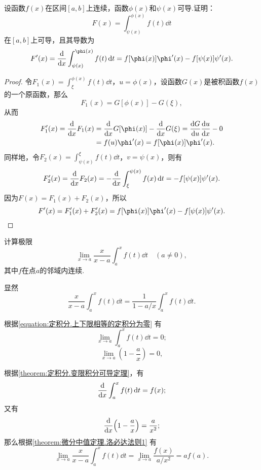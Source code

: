 \begin{example}
设函数\(f(x)\)在区间\([a,b]\)上连续，函数\(\phi(x)\)和\(\psi(x)\)可导.证明：\[
F(x) = \int_{\psi(x)}^{\phi(x)} f(t) \dd{t}
\]在\([a,b]\)上可导，且其导数为\begin{equation}\label{equation:定积分.含参变量积分的导数1}
F'(x) = \dv{x} \int_{\psi(x)}^{\phi(x)} f(t) \dd{t}
= f[\phi(x)] \phi'(x) - f[\psi(x)] \psi'(x).
\end{equation}
\begin{proof}
令\(F_1(x) = \int_{\xi}^{\phi(x)} f(t) \dd{t}\)，\(u = \phi(x)\)，设函数\(G(x)\)是被积函数\(f(x)\)的一个原函数，那么\[
F_1(x) = G[\phi(x)] - G(\xi),
\]从而\begin{align*}
F'_1(x) = \dv{x} F_1(x)
&= \dv{x} G[\phi(x)] - \dv{x} G(\xi) = \dv{G}{u} \dv{u}{x} - 0 \\
&= f(u) \phi'(x) = f[\phi(x)] \phi'(x).
\end{align*}
同样地，令\(F_2(x) = \int_{\psi(x)}^{\xi} f(t) \dd{t}\)，\(v = \psi(x)\)，则有\[
F'_2(x) = \dv{x} F_2(x) = -\dv{x} \int_{\xi}^{\psi(x)} f(x) \dd{t}
= -f[\psi(x)] \psi'(x).
\]
因为\(F(x) = F_1(x) + F_2(x)\)，所以\[
F'(x) = F'_1(x) + F'_2(x)
= f[\phi(x)] \phi'(x) - f[\psi(x)] \psi'(x).
\qedhere
\]
\end{proof}
\end{example}

\begin{example}
计算极限\[
\lim_{x \to a} \frac{x}{x-a} \int_a^x f(t) \dd{t}
\quad(a\neq0),
\]其中\(f\)在点\(a\)的邻域内连续.
\begin{solution}
显然\[
\frac{x}{x-a} \int_a^x f(t) \dd{t}
= \frac{1}{1 - a/x} \int_a^x f(t) \dd{t}.
\]

根据\cref{equation:定积分.上下限相等的定积分为零} 有
\[
\lim_{x \to a} \int_a^x f(t) \dd{t} = 0;
\]
\[
\lim_{x \to a} \left( 1 - \frac{a}{x} \right) = 0,
\]

根据\cref{theorem:定积分.变限积分可导定理}，有\[
\dv{x} \int_a^x f(t) \dd{t} = f(x);
\]又有\[
\dv{x}(1 - \frac{a}{x}) = \frac{a}{x^2};
\]那么根据\cref{theorem:微分中值定理.洛必达法则1} 有\[
\lim_{x \to a} \frac{x}{x-a} \int_a^x f(t) \dd{t}
= \lim_{x \to a} \frac{f(x)}{a/x^2}
= a f(a).
\]
\end{solution}
\end{example}

